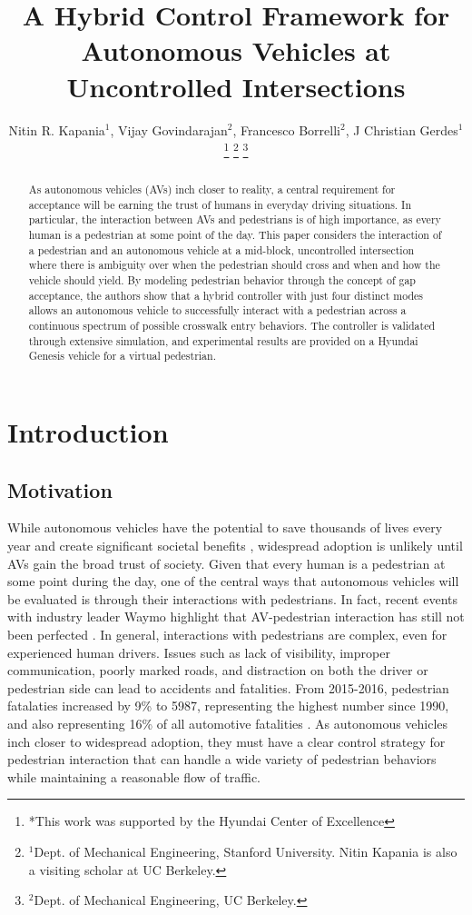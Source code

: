 \documentclass[letterpaper, 10 pt, conference]{ieeeconf}  %
\title{\LARGE \bf
A Hybrid Control Framework for Autonomous Vehicles at Uncontrolled Intersections}
\author{Nitin R. Kapania$^{1}$, Vijay Govindarajan$^{2}$, Francesco Borrelli$^{2}$, J Christian Gerdes$^{1}$%
\thanks{*This work was supported by the Hyundai Center of Excellence}%
\thanks{$^{1}$Dept. of Mechanical Engineering, Stanford University. Nitin Kapania is also a visiting scholar at UC Berkeley.}%
\thanks{$^{2}$Dept. of Mechanical Engineering, UC Berkeley.}%
}
\begin{document}
\maketitle
\thispagestyle{empty}
\pagestyle{empty}


\begin{abstract}

As autonomous vehicles (AVs) inch closer to reality, a central requirement for acceptance will be earning the trust of humans in everyday driving situations. In particular, the interaction between AVs and pedestrians is of
high importance, as every human is a pedestrian at some point of the day. This paper considers the interaction of a pedestrian and an autonomous vehicle at a mid-block, uncontrolled intersection where there is ambiguity
over when the pedestrian should cross and when and how the vehicle should yield. By modeling pedestrian behavior through the concept of gap acceptance, the authors show that a hybrid controller with just four distinct modes allows an autonomous vehicle to successfully interact with a pedestrian across a continuous spectrum of possible crosswalk entry behaviors. The controller is validated through extensive simulation, and experimental results are provided on a Hyundai Genesis vehicle for a virtual pedestrian.  

\end{abstract}


\section{Introduction}

\subsection{Motivation}

While autonomous vehicles have the potential to save thousands of lives every year and create significant societal benefits \cite{Fagnant2015}, widespread adoption is unlikely until AVs gain the broad trust of society. Given that every human is a pedestrian at some point during the day, one of the central ways that autonomous vehicles will be evaluated is through their interactions with pedestrians. In fact, recent events with industry leader Waymo highlight that AV-pedestrian interaction has still not been perfected \cite{MattRichtelandConorDougherty2015}. In general, interactions with pedestrians are complex, even for experienced human drivers. Issues such as lack of visibility, improper communication, poorly marked roads, and distraction on both the driver or pedestrian side can lead to accidents and fatalities. From 2015-2016, pedestrian fatalaties increased by 9\% to 5987, representing the highest number since 1990, and also representing 16\% of all automotive fatalities \cite{HighwayTrafficSafetyAdministration2016}. As autonomous vehicles inch closer to widespread adoption, they must have a clear control strategy for pedestrian interaction that can handle a wide variety of pedestrian behaviors while maintaining a reasonable flow of traffic.    
\end{document}

